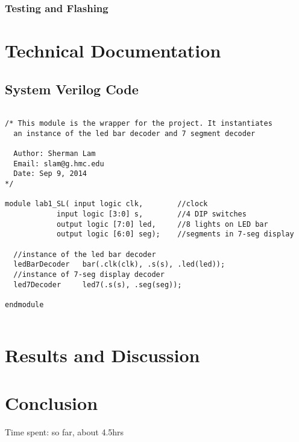 \documentclass[11pt]{article}
\begin{document}
\label{sec:software_LEDbar}

\subsubsection{Testing and Flashing}



\section{Technical Documentation}



\subsection{System Verilog Code}

\small\begin{verbatim}

/* This module is the wrapper for the project. It instantiates
  an instance of the led bar decoder and 7 segment decoder
  
  Author: Sherman Lam
  Email: slam@g.hmc.edu
  Date: Sep 9, 2014
*/

module lab1_SL( input logic clk,        //clock
            input logic [3:0] s,        //4 DIP switches
            output logic [7:0] led,     //8 lights on LED bar
            output logic [6:0] seg);    //segments in 7-seg display
  
  //instance of the led bar decoder
  ledBarDecoder   bar(.clk(clk), .s(s), .led(led));   
  //instance of 7-seg display decoder
  led7Decoder     led7(.s(s), .seg(seg)); 

endmodule


\end{verbatim}




\clearpage

\section{Results and Discussion}




\section{Conclusion}


Time spent: so far, about 4.5hrs
\end{document}
